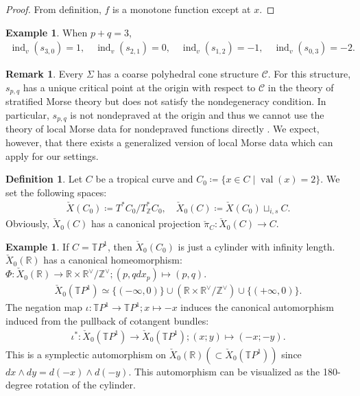 \documentclass[a4paper,dvipdfmx,reqno,12pt]{amsart}
\theoremstyle{definition}
\newtheorem{definition}[theorem]{Definition}
\newtheorem{example}[theorem]{Example}
\newtheorem{remark}[theorem]{Remark}
\newcommand{\deq}{\coloneqq}
\newcommand{\Z}{\mathbb{Z}}%
\newcommand{\opn}[1]{\operatorname{#1}}
\numberwithin{equation}{section}
\begin{document}
\begin{proof}
From definition, $f$ is a monotone function except 
at $x$.
\end{proof}

\begin{example}
When $p+q=3$, 
\begin{align}
\opn{ind}_v(s_{3,0})=1, \quad \opn{ind}_v(s_{2,1})=0, \quad \opn{ind}_v(s_{1,2})=-1, \quad \opn{ind}_v(s_{0,3})=-2.
\end{align}
\end{example}

\begin{remark}
\label{remark-nondeprave-curve}
Every $\Sigma$ has a coarse polyhedral cone structure 
$\mathscr{C}$. 
For this structure, $s_{p,q}$ has a unique critical 
point at the origin with respect to 
$\mathscr{C}$ in the theory of stratified 
Morse theory \cite[Part I.2.1]{MR932724}
but does not satisfy the nondegeneracy condition.
In particular, $s_{p,q}$ is not nondepraved 
at the origin \cite[Part I.2.3.]{MR932724} 
and thus we cannot use the theory of local Morse 
data for nondepraved functions directly 
\cite[Part I.3.5.2 Definition]{MR932724}. 
We expect, however, that there exists a 
generalized version of local Morse data 
which can apply for our settings.
\end{remark}

\begin{definition}
\label{definition-continuous-section}
Let $C$ be a tropical curve and 
$C_{0}\deq \{x\in C\mid \opn{val}(x)=2\}$.
We set the following spaces:
\begin{align}
\check{X}(C_0)\deq T^{*}C_0/T^{*}_{\Z}C_0, \quad 
\check{X}_0(C)\deq \check{X}(C_0)\sqcup_{i,s}C.
\end{align}
Obviously, $\check{X}_0(C)$ has a canonical projection
$\check{\pi}_C \colon \check{X}_0(C)\to C$.
\end{definition}

\begin{example}
If $C=\mathbb{T}P^{1}$, then 
$\check{X}_0(C_0)$ is just a 
cylinder with infinity length.
$\check{X}_0(\mathbb{R})$ has a canonical homeomorphism:
$\Phi \colon \check{X}_0(\mathbb{R})\to 
\mathbb{R}\times \mathbb{R}^{\vee}/\mathbb{Z}^{\vee};
(p,q dx_p)\mapsto (p,q)$.
\begin{align}
\check{X}_0(\mathbb{T}P^{1})\simeq 
\{(-\infty,0)\}\cup(\mathbb{R}\times \mathbb{R}^{\vee}/\mathbb{Z}^{\vee})
\cup \{(+\infty,0)\}.
\end{align}
The negation map
$\iota \colon\mathbb{T}P^{1}\to \mathbb{T}P^{1}; x\mapsto -x$
induces the canonical automorphism induced from the pullback of cotangent bundles:
\begin{align}
\iota^{*}\colon \check{X}_0(\mathbb{T}P^{1})
\to \check{X}_0(\mathbb{T}P^{1}); (x;y)\mapsto (-x;-y). 
\end{align}
This is a symplectic automorphism on 
$\check{X}_0(\mathbb{R}) (\subset \check{X}_0(\mathbb{T}P^{1}))$ since 
$dx\wedge dy=d(-x)\wedge d(-y)$.
This automorphism can be visualized as the 180-degree rotation of the 
cylinder.
\end{example}
\end{document}

